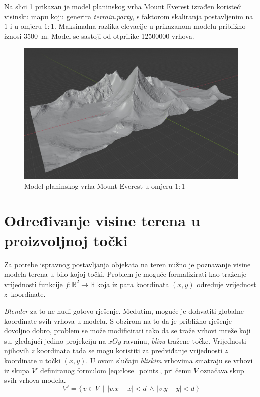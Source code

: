 \documentclass[times, utf8, zavrsni, numeric]{fer}
\begin{document}
		Na slici \ref{fig:terrain_everest} prikazan je model planinskog vrha Mount Everest izrađen koristeći visinsku mapu koju generira \textit{terrain.party}, s faktorom skaliranja postavljenim na $1$ i u omjeru $1:1$.
		Maksimalna razlika elevacije u prikazanom modelu približno iznosi \SI{3500}{\meter}.
		Model se sastoji od otprilike \SI{12 500 000}{} vrhova.
		
		\begin{figure}[h]
			\includegraphics[width=0.95\linewidth]{figures/terrain_everest.jpg}
			\centering
			\caption{Model planinskog vrha Mount Everest u omjeru $1:1$}
			\label{fig:terrain_everest}
		\end{figure}
	
	
	
	\section{Određivanje visine terena u proizvoljnoj točki}
	
		Za potrebe ispravnog postavljanja objekata na teren nužno je poznavanje visine modela terena u bilo kojoj točki.
		Problem je moguće formalizirati kao traženje vrijednosti funkcije $f \colon \mathbb{R}^2 \to \mathbb{R}$ koja iz para koordinata $(x, y)$ određuje vrijednost \mbox{$z$ koordinate}.
		
		\textit{Blender} za to ne nudi gotovo rješenje.
		Međutim, moguće je dohvatiti globalne koordinate svih vrhova u modelu.
		S obzirom na to da je približno rješenje dovoljno dobro, problem se može modificirati tako da se traže vrhovi mreže  koji su, gledajući jedino projekciju na $xOy$ ravninu, \textit{blizu} tražene točke.
		Vrijednosti njihovih $z$ koordinata tada se mogu koristiti za predviđanje vrijednosti $z$ koordinate u točki $(x,y)$.
		U ovom slučaju \textit{bliskim} vrhovima smatraju se vrhovi iz skupa $V'$ definiranog formulom \ref{eq:close_points}, pri čemu $V$ označava skup svih vrhova modela.
		\begin{equation}
			V' = \{\, v \in V \, \mid \, \left| v.x - x \right| < d \, \land \, \left| v.y - y \right| < d \,\}\label{eq:close_points}
		\end{equation}
		
\end{document}

